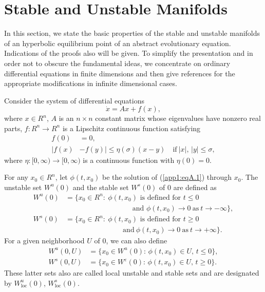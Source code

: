 \documentclass{surv-l}
\theoremstyle{plain}
\theoremstyle{definition}
\numberwithin{equation}{section}
\numberwithin{figure}{chapter}
\renewcommand\theequation{\arabic{section}.\arabic{equation}}
\begin{document}
\section*{Stable and Unstable Manifolds}

In this section, we state the basic properties of the stable and unstable manifolds of an hyperbolic equilibrium point of an abstract evolutionary equation. Indications of the proofs also will be given. To simplify the presentation and in order not to obscure the fundamental ideas, we concentrate on ordinary differential equations in finite dimensions and then give references for the appropriate modifications in infinite dimensional cases.

Consider the system of differential equations
\renewcommand\theequation{A.\arabic{equation}}
\setcounter{equation}{0}
\begin{equation}\label{app1:eqA.1}
\dot{x}=Ax+f(x),
\end{equation}
where $x\in R^{n}$, $A$ is an $n\times n$ constant matrix whose eigenvalues have nonzero real parts, $f:R^{n}\rightarrow R^{n}$ is a Lipschitz continuous function satisfying
\begin{equation}\label{app1:eqA.2}
\begin{split}
f(0)&=0,\\
|f(x)&-f(y)|\leq\eta(\sigma)(x-y)\quad\mathrm{if}\ |x|,\,|y|\leq\sigma,
\end{split}
\end{equation}
where $\eta:[0,\infty)\rightarrow[0,\infty)$ is a continuous function with $\eta(0)=0$.

For any $x_{0}\in R^{n}$, let $\phi(t,x_{0})$ be the solution of (\ref{app1:eqA.1}) through $x_{0}$. The unstable set
$W^{u}(0)$ and the stable set $W^{s}(0)$ of $0$ are defined as
\begin{align*}
W^{u}(0)&=\{x_{0}\in R^{n}:\ \phi(t,x_{0})\text{ is defined for } t\leq 0\\
&\qquad \qquad \qquad \qquad \quad\text{ and }\phi(t,x_{0})\rightarrow 0\ \mathrm{as}\ t\rightarrow-\infty\},\\
W^{s}(0)&=\{x_{0}\in R^{n}:\ \phi(t,x_{0})\text{ is defined for } t\geq 0\\
&\qquad \qquad \qquad \qquad \mathrm{and}\ \phi(t,x_{0})\rightarrow 0\ \mathrm{as}\ t\rightarrow+\infty\}.
\end{align*}
For a given neighborhood $U$ of $0$, we can also define
\begin{align*}
W^{u}(0, U)&=\{x_{0}\in W^{u}(0):\,\phi(t, x_{0})\in U,\, t\leq 0\},\\
W^{s}(0, U)&=\{x_{0}\in W^{\varepsilon}(0):\,\phi(t, x_{0})\in U,\,t\geq 0\}.
\end{align*}
These latter sets also are called local unstable and stable sets and are designated by $W_{\mathrm{loc}}^{u}(0)$, $W_{\mathrm{loc}}^{s}(0)$.
\end{document}
